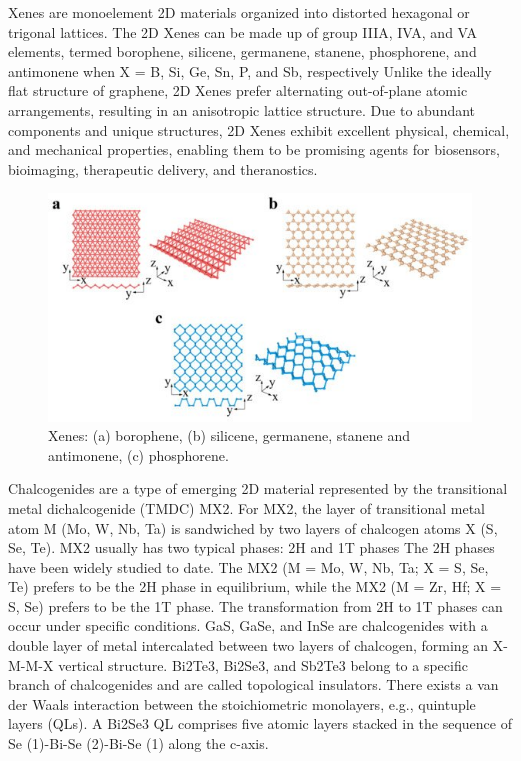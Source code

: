 \documentclass[12pt,a4paper]{report}
\begin{document}
  Xenes are monoelement 2D materials organized into distorted hexagonal or trigonal lattices. The 2D Xenes can be made up of group IIIA, IVA, and VA elements, termed borophene, silicene, germanene, stanene, phosphorene, and antimonene when X = B, Si, Ge, Sn, P, and Sb, respectively Unlike the ideally flat structure of graphene, 2D Xenes prefer alternating out-of-plane atomic arrangements, resulting in an anisotropic lattice structure. Due to abundant components and unique structures, 2D Xenes exhibit excellent physical, chemical, and mechanical properties, enabling them to be promising agents for biosensors, bioimaging, therapeutic delivery, and theranostics.
  \begin{figure}
    \centering
    \includegraphics[scale=0.3]{2.2.jpg}
    \caption{Xenes: (a) borophene, (b) silicene, germanene, stanene and antimonene, (c) phosphorene.}
    \label{xenefam}
    \end{figure}
  
    Chalcogenides are a type of emerging 2D material represented by the transitional metal dichalcogenide (TMDC) MX2. For MX2, the layer of transitional metal atom M (Mo, W, Nb, Ta) is sandwiched by two layers of chalcogen atoms X (S, Se, Te). MX2 usually has two typical phases: 2H and 1T phases The 2H phases have been widely studied to date. The MX2 (M = Mo, W, Nb, Ta; X = S, Se, Te) prefers to be the 2H phase in equilibrium, while the MX2 (M = Zr, Hf; X = S, Se) prefers to be the 1T phase. The transformation from 2H to 1T phases can occur under specific conditions. GaS, GaSe, and InSe are chalcogenides with a double layer of metal intercalated between two layers of chalcogen, forming an X-M-M-X vertical structure. Bi2Te3, Bi2Se3, and Sb2Te3 belong to a specific branch of chalcogenides and are called topological insulators. There exists a van der Waals interaction between the stoichiometric monolayers, e.g., quintuple layers (QLs). A Bi2Se3 QL comprises five atomic layers stacked in the sequence of Se (1)-Bi-Se (2)-Bi-Se (1) along the c-axis.
    
\end{document}
